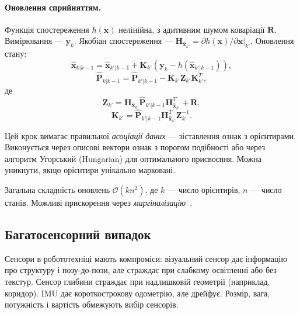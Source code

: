 \paragraph{Оновлення сприйняттям.} Функція спостереження $h(\boldsymbol{x})$ нелінійна, з адитивним шумом коваріації $\boldsymbol{R}$. Вимірювання — $\boldsymbol{y}_k$. Якобіан спостереження — $\boldsymbol{H}_{\hat{\boldsymbol{x}}_{k'}} = \partial h(\boldsymbol{x})/\partial \boldsymbol{x}|_{k'}$. Оновлення стану:
\begin{equation}
\hat{\boldsymbol{x}}_{k|k-1}= \hat{\boldsymbol{x}}_{k'|k-1} + \boldsymbol{K}_{k'}(\boldsymbol{y}_{k} - h(\hat{\boldsymbol{x}}_{k'|k-1})),
\end{equation}
\begin{equation}
\hat{\boldsymbol{P}}_{k|k-1}= \hat{\boldsymbol{P}}_{k'|k-1} - \boldsymbol{K}_{k'} \boldsymbol{Z}_{k'} \boldsymbol{K}_{k'}^T,
\end{equation}
де
\begin{equation}
\boldsymbol{Z}_{k'} = \boldsymbol{H}_{\hat{\boldsymbol{x}}_{k'}} \hat{\boldsymbol{P}}_{k'|k-1} \boldsymbol{H}_{\hat{\boldsymbol{x}}_{k'}}^T + \boldsymbol{R},
\end{equation}
\begin{equation}
\boldsymbol{K}_{k'} = \hat{\boldsymbol{P}}_{k'|k-1} \boldsymbol{H}_{\hat{\boldsymbol{x}}_{k'}}^T \boldsymbol{Z}_{k'}^{-1}.
\end{equation}

Цей крок вимагає правильної \emph{асоціації даних} — зіставлення ознак з орієнтирами. Виконується через описові вектори ознак з порогом подібності або через алгоритм Угорський (Hungarian) для оптимального присвоєння. Можна уникнути, якщо орієнтири унікально марковані.

Загальна складність оновлень $\mathcal{O}(kn^2)$, де $k$ — число орієнтирів, $n$ — число станів. Можливі прискорення через \emph{маргіналізацію}~\cite{sibley2010sliding}.

\subsection{Багатосенсорний випадок}
Сенсори в робототехніці мають компроміси: візуальний сенсор дає інформацію про структуру і позу-до-пози, але страждає при слабкому освітленні або без текстур. Сенсор глибини страждає при надлишковій геометрії (наприклад, коридор). IMU дає короткострокову одометрію, але дрейфує. Розмір, вага, потужність і вартість обмежують вибір сенсорів.

